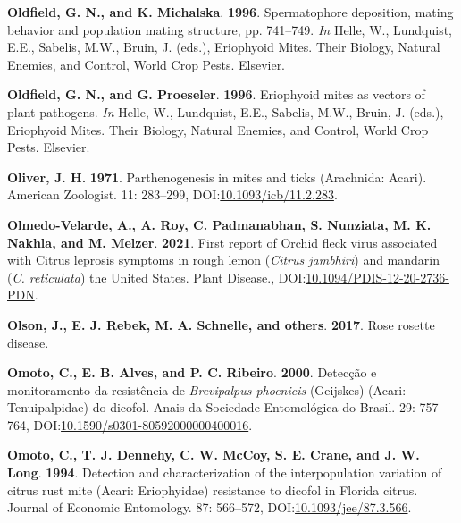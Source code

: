 \documentclass[12pt,final,CPage]{ufthesis}
\newlength{\cslhangindent}
\newenvironment{CSLReferences}[2] %
{%
	\setlength{\parindent}{0pt}
	\ifodd #1 \everypar{\setlength{\hangindent}{\cslhangindent}}\ignorespaces\fi
	\ifnum #2 > 0
	\setlength{\parskip}{#2\baselineskip}
	\fi
}%
{}
\begin{document}
{\begin{CSLReferences}{1}{0}
  \leavevmode{}%
  \textbf{Oldfield, G. N., and K. Michalska}. \textbf{1996}. Spermatophore deposition, mating behavior and population mating structure, pp. 741--749. \emph{In} Helle, W., Lundquist, E.E., Sabelis, M.W., Bruin, J. (eds.), Eriophyoid Mites. Their Biology, Natural Enemies, and Control, World Crop Pests. Elsevier.

  \leavevmode{}%
  \textbf{Oldfield, G. N., and G. Proeseler}. \textbf{1996}. Eriophyoid mites as vectors of plant pathogens. \emph{In} Helle, W., Lundquist, E.E., Sabelis, M.W., Bruin, J. (eds.), Eriophyoid Mites. Their Biology, Natural Enemies, and Control, World Crop Pests. Elsevier.

  \leavevmode{}%
  \textbf{Oliver, J. H.} \textbf{1971}. Parthenogenesis in mites and ticks ({Arachnida}: {Acari}). American Zoologist. 11: 283--299, DOI:\href{https://doi.org/10.1093/icb/11.2.283}{10.1093/icb/11.2.283}.

  \leavevmode{}%
  \textbf{Olmedo-Velarde, A., A. Roy, C. Padmanabhan, S. Nunziata, M. K. Nakhla, and M. Melzer}. \textbf{2021}. First report of {Orchid fleck virus} associated with {Citrus leprosis} symptoms in rough lemon ({\emph{Citrus jambhiri}}) and mandarin ({\emph{C. reticulata}}) the {United States}. Plant Disease., DOI:\href{https://doi.org/10.1094/PDIS-12-20-2736-PDN}{10.1094/PDIS-12-20-2736-PDN}.

  \leavevmode{}%
  \textbf{Olson, J., E. J. Rebek, M. A. Schnelle, and others}. \textbf{2017}. Rose rosette disease.

  \leavevmode{}%
  \textbf{Omoto, C., E. B. Alves, and P. C. Ribeiro}. \textbf{2000}. Detec{ç}{ã}o e monitoramento da resist{ê}ncia de {\emph{Brevipalpus phoenicis}} ({Geijskes}) ({Acari}: {Tenuipalpidae}) do dicofol. Anais da Sociedade Entomol{ó}gica do Brasil. 29: 757--764, DOI:\href{https://doi.org/10.1590/s0301-80592000000400016}{10.1590/s0301-80592000000400016}.

  \leavevmode{}%
  \textbf{Omoto, C., T. J. Dennehy, C. W. McCoy, S. E. Crane, and J. W. Long}. \textbf{1994}. Detection and characterization of the interpopulation variation of citrus rust mite ({Acari}: {Eriophyidae}) resistance to dicofol in {Florida} citrus. Journal of Economic Entomology. 87: 566--572, DOI:\href{https://doi.org/10.1093/jee/87.3.566}{10.1093/jee/87.3.566}.


\end{CSLReferences}}
\end{document}
